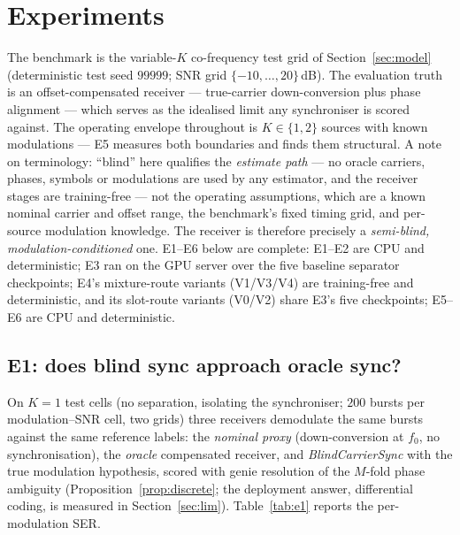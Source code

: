 \documentclass[journal]{IEEEtran}
\begin{document}
\section{Experiments}
\label{sec:exp}

The benchmark is the variable-$K$ co-frequency test grid of
Section~\ref{sec:model}
(deterministic test seed $99999$; SNR grid $\{-10, \dots, 20\}$\,dB).
The evaluation truth is an offset-compensated receiver ---
true-carrier down-conversion plus phase alignment --- which serves as
the idealised limit any synchroniser is scored against. The operating envelope throughout is
$K \in \{1,2\}$ sources with known modulations --- E5 measures both
boundaries and finds them structural. A note on terminology:
``blind'' here qualifies the \emph{estimate path} --- no oracle
carriers, phases, symbols or modulations are used by any estimator, and
the receiver stages are training-free --- not the operating assumptions,
which are a known nominal carrier and offset range, the benchmark's
fixed timing grid, and per-source modulation knowledge. The receiver is
therefore precisely a \emph{semi-blind, modulation-conditioned}
one. E1--E6 below are complete:
E1--E2 are CPU
and deterministic; E3 ran on the GPU server over the five baseline
separator checkpoints; E4's mixture-route variants (V1/V3/V4) are training-free
and deterministic, and its slot-route variants (V0/V2) share E3's five
checkpoints; E5--E6 are CPU and deterministic.

\subsection{E1: does blind sync approach oracle sync?}
\label{sec:e1}

On $K{=}1$ test cells (no separation, isolating the synchroniser; $200$
bursts per modulation--SNR cell, two grids) three receivers demodulate
the same bursts against the same reference labels: the \emph{nominal
proxy} (down-conversion at $f_0$, no synchronisation), the
\emph{oracle} compensated receiver, and \emph{BlindCarrierSync} with
the true modulation hypothesis, scored with genie resolution of the
$M$-fold phase ambiguity (Proposition~\ref{prop:discrete}; the
deployment answer, differential coding, is measured in
Section~\ref{sec:lim}).
Table~\ref{tab:e1} reports the per-modulation SER.
\end{document}
